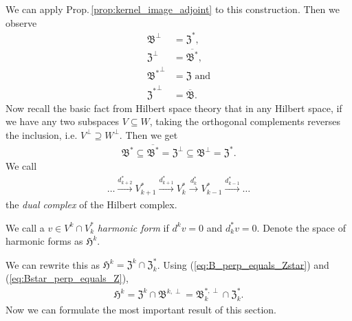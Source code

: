 \documentclass[../master_thesis.tex]{subfiles}
\begin{document}
We can apply Prop.\,\ref{prop:kernel_image_adjoint} to this construction. 
Then we observe 
\begin{align}
    \mathfrak{B}^\perp &= \mathfrak{Z}^*, \label{eq:B_perp_equals_Zstar}
    \\ \mathfrak{Z}^\perp &= \overline{\mathfrak{B}^*},\label{eq:Z_perp_equals_Bstar}
    \\ \mathfrak{B^*}^\perp &= \mathfrak{Z} \text{ and}\label{eq:Bstar_perp_equals_Z}
    \\ \mathfrak{Z^*}^\perp &= \overline{\mathfrak{B}}.\label{eq:Zstar_perp_equals_B}
\end{align}
Now recall the basic fact from Hilbert space theory that 
in any Hilbert space, if we have any two subspaces $V \subseteq W$, taking the 
orthogonal complements reverses the inclusion, i.e.
$V^\perp \supseteq W^\perp$. Then we get 
\begin{align}
    \mathfrak{B}^* \subseteq \overline{\mathfrak{B}^*} 
    = \mathfrak{Z}^\perp  \subseteq \mathfrak{B}^\perp 
    = \mathfrak{Z}^*. \label{eq:image_kernel_of_adjoint_in_hilbert_complex}
\end{align}
We call 
\begin{align*}
    \dots \xrightarrow{d^*_{k+2}} V^*_{k+1}  \xrightarrow{d^*_{k+1}} V^*_{k}
    \xrightarrow{d^*_{k}} V^*_{k-1} \xrightarrow{d^*_{k-1}} \dots
\end{align*}
the \textit{dual complex} of the Hilbert complex.

\begin{definition}
    We call a $v \in V^k \cap V^*_k$ \textit{harmonic form} if $d^k v = 0$ and 
    $d^*_k v = 0$. Denote the space of harmonic forms as 
    $\mathfrak{H}^k$.
\end{definition}
\noindent We can rewrite this as $\mathfrak{H}^k = \mathfrak{Z}^k 
\cap \mathfrak{Z}^*_k$. Using 
(\ref{eq:B_perp_equals_Zstar}) and (\ref{eq:Bstar_perp_equals_Z}),
\begin{align*}
    \mathfrak{H}^k = \mathfrak{Z}^k \cap \mathfrak{B}^{k,\perp}
         = \mathfrak{B}_k^{*,\perp} \cap \mathfrak{Z}^*_k.
\end{align*}
Now we can formulate the most important 
result of this section. 
\end{document}
